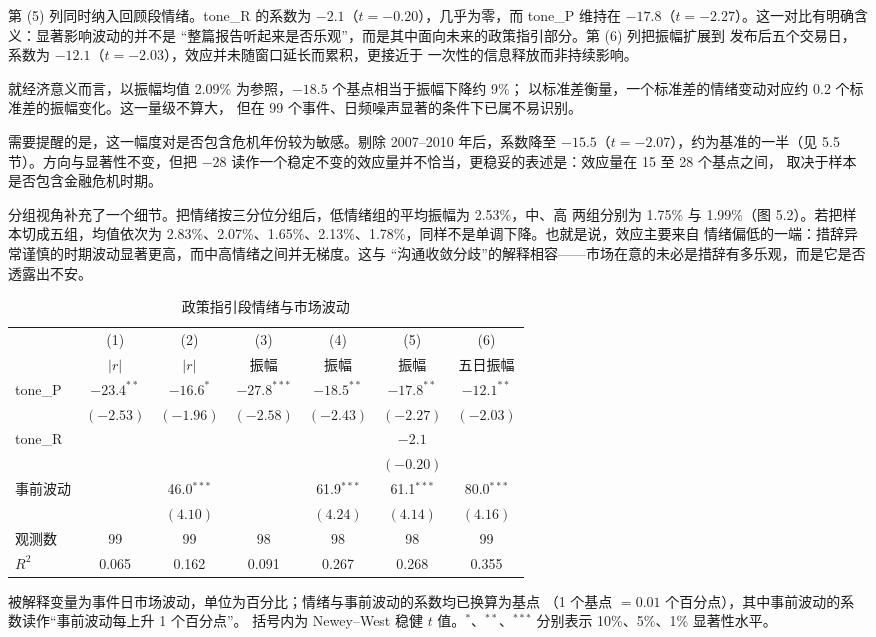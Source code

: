 第 (5) 列同时纳入回顾段情绪。tone\_R 的系数为 $-2.1$（$t=-0.20$），几乎为零，而
tone\_P 维持在 $-17.8$（$t=-2.27$）。这一对比有明确含义：显著影响波动的并不是
``整篇报告听起来是否乐观''，而是其中面向未来的政策指引部分。第 (6) 列把振幅扩展到
发布后五个交易日，系数为 $-12.1$（$t=-2.03$），效应并未随窗口延长而累积，更接近于
一次性的信息释放而非持续影响。

就经济意义而言，以振幅均值 2.09\% 为参照，$-18.5$ 个基点相当于振幅下降约 9\%；
以标准差衡量，一个标准差的情绪变动对应约 0.2 个标准差的振幅变化。这一量级不算大，
但在 99 个事件、日频噪声显著的条件下已属不易识别。

需要提醒的是，这一幅度对是否包含危机年份较为敏感。剔除 2007--2010 年后，系数降至
$-15.5$（$t=-2.07$），约为基准的一半（见 5.5 节）。方向与显著性不变，但把 $-28$
读作一个稳定不变的效应量并不恰当，更稳妥的表述是：效应量在 15 至 28 个基点之间，
取决于样本是否包含金融危机时期。

分组视角补充了一个细节。把情绪按三分位分组后，低情绪组的平均振幅为 2.53\%，中、高
两组分别为 1.75\% 与 1.99\%（图 5.2）。若把样本切成五组，均值依次为
2.83\%、2.07\%、1.65\%、2.13\%、1.78\%，同样不是单调下降。也就是说，效应主要来自
情绪偏低的一端：措辞异常谨慎的时期波动显著更高，而中高情绪之间并无梯度。这与
``沟通收敛分歧''的解释相容——市场在意的未必是措辞有多乐观，而是它是否透露出不安。

\begin{table}[htbp]
\centering
\small
\begin{threeparttable}
\caption{政策指引段情绪与市场波动}
\label{tab:vol}
\begin{tabular}{lcccccc}
\toprule
 & (1) & (2) & (3) & (4) & (5) & (6) \\
 & $|r|$ & $|r|$ & 振幅 & 振幅 & 振幅 & 五日振幅 \\
\midrule
tone\_P        & $-23.4^{**}$ & $-16.6^{*}$ & $-27.8^{***}$ & $-18.5^{**}$ & $-17.8^{**}$ & $-12.1^{**}$ \\
                & $(-2.53)$ & $(-1.96)$ & $(-2.58)$ & $(-2.43)$ & $(-2.27)$ & $(-2.03)$ \\
tone\_R        & & & & & $-2.1$ & \\
                & & & & & $(-0.20)$ & \\
事前波动        & & 46.0$^{***}$ & & 61.9$^{***}$ & 61.1$^{***}$ & 80.0$^{***}$ \\
                & & $(4.10)$ & & $(4.24)$ & $(4.14)$ & $(4.16)$ \\
\midrule
观测数          & 99 & 99 & 98 & 98 & 98 & 99 \\
$R^2$           & 0.065 & 0.162 & 0.091 & 0.267 & 0.268 & 0.355 \\
\bottomrule
\end{tabular}
\begin{tablenotes}[flushleft]
\footnotesize
\item 被解释变量为事件日市场波动，单位为百分比；情绪与事前波动的系数均已换算为基点
（1 个基点 $=0.01$ 个百分点），其中事前波动的系数读作``事前波动每上升 1 个百分点''。
括号内为 Newey--West 稳健 $t$ 值。$^{*}$、$^{**}$、$^{***}$ 分别表示 10\%、5\%、1\% 显著性水平。
\end{tablenotes}
\end{threeparttable}
\end{table}

